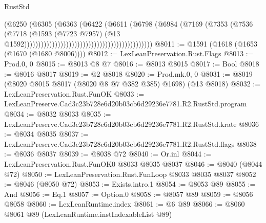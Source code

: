\begin{lexlean}{RustStd}
\begin{coremodule}
                                                                      (@6250
                                                                        (@6305
                                                                          (@6363
                                                                            (@6422
                                                                              (@6611
                                                                                (@6798
                                                                                  (@6984
                                                                                    (@7169
                                                                                      (@7353
                                                                                        (@7536
                                                                                          (@7718
                                                                                            (@1593
                                                                                              (@7723
                                                                                                @7957)
                                                                                              (@13
                                                                                                @1592))))))))))))))))))))))))))))))))))))))))))))))
@8011 := @1591 (@1618 (@1653 (@1670 (@1680 @8006))))
@8012 := LexLeanPreservation.Rust.Flags
@8013 := Prod.{0, 0}
@8015 := @8013 @8 @7
@8016 := @8013 @8015
@8017 := Bool
@8018 := @8016 @8017
@8019 := @2 @8018
@8020 := Prod.mk.{0, 0}
@8031 := @8019 (@8020 @8015 @8017 (@8020 @8 @7 @382 @385) @1698) (@13 @8018)
@8032 := LexLeanPreservation.Rust.FunOK
@8033 := LexLeanPreserve.Cad3c23b728e6d20b03cb6d29236e7781.R2.RustStd.program
@8034 := @8032 @8033
@8035 := LexLeanPreserve.Cad3c23b728e6d20b03cb6d29236e7781.R2.RustStd.krate
@8036 := @8034 @8035
@8037 := LexLeanPreserve.Cad3c23b728e6d20b03cb6d29236e7781.R2.RustStd.flags
@8038 := @8036 @8037
@8039 := @8038 @72
@8040 := Or.inl
@8044 := LexLeanPreservation.Rust.FunOK0 @8033 @8035 @8037
@8046 := @8040 (@8044 @72)
@8050 := LexLeanPreservation.Rust.FunLoop @8033 @8035 @8037
@8052 := @8046 (@8050 @72)
@8053 := Exists.intro.{1}
@8054 := @8053 @89
@8055 := And
@8056 := Eq.{1}
@8057 := Option.{0}
@8058 := @8057 @89
@8059 := @8056 @8058
@8060 := LexLeanRuntime.index
@8061 := @6 @89
@8066 := @8060 @8061 @89 (LexLeanRuntime.instIndexableList @89)

\end{coremodule}
\end{lexlean}
